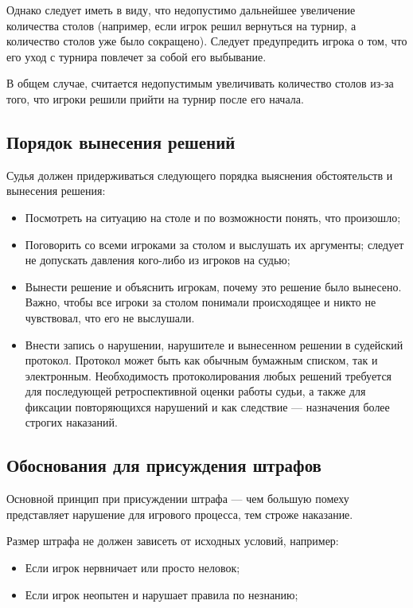 Однако следует иметь в виду, что недопустимо дальнейшее увеличение количества столов (например, если игрок решил вернуться на турнир, а количество столов уже было сокращено). Следует предупредить игрока о том, что его уход с турнира повлечет за собой его выбывание.

В общем случае, считается недопустимым увеличивать количество столов из-за того, что игроки решили прийти на турнир после его начала.

\subsection{Порядок вынесения решений}

Судья должен придерживаться следующего порядка выяснения обстоятельств и вынесения решения:
\begin{itemize}
	\item Посмотреть на ситуацию на столе и по возможности понять, что произошло;
	\item Поговорить со всеми игроками за столом и выслушать их аргументы; следует не допускать давления кого-либо из игроков на судью;
	\item Вынести решение и объяснить игрокам, почему это решение было вынесено. Важно, чтобы все игроки за столом понимали происходящее и никто не чувствовал, что его не выслушали.
	\item Внести запись о нарушении, нарушителе и вынесенном решении в судейский протокол. Протокол может быть как обычным бумажным списком, так и электронным. Необходимость протоколирования любых решений требуется для последующей ретроспективной оценки работы судьи, а также для фиксации повторяющихся нарушений и как следствие --- назначения более строгих наказаний.
\end{itemize}

\subsection{Обоснования для присуждения штрафов}

Основной принцип при присуждении штрафа --- чем большую помеху представляет нарушение для игрового процесса, тем строже наказание.

Размер штрафа не должен зависеть от исходных условий, например:
\begin{itemize}
	\item Если игрок нервничает или просто неловок;
	\item Если игрок неопытен и нарушает правила по незнанию;
\end{itemize}


